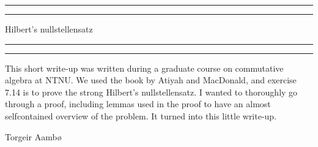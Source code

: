 

\begin{titlingpage}
    \vspace*{\fill}
    \rule[-11pt]{\textwidth}{1pt}
    \rule{\textwidth}{0.5pt}
    \begin{center}
    \Large Hilbert's nullstellensatz\\   
    \end{center}
    \rule{\textwidth}{0.5pt}
    \rule[10.1pt]{\textwidth}{1pt}
    This short write-up was written during a graduate course on commutative algebra at NTNU. 
    We used the book by Atiyah and MacDonald, and exercise 7.14 is to prove the strong Hilbert's nullstellensatz. 
    I wanted to thoroughly go through a proof, 
    including lemmas used in the proof to have an almost selfcontained overview of the problem. 
    It turned into this little write-up. 
    \begin{center}
    Torgeir Aambø 
    \end{center}
    \vspace{\fill}
    \tableofcontents
    \vspace{\fill}
    
    
\end{titlingpage}